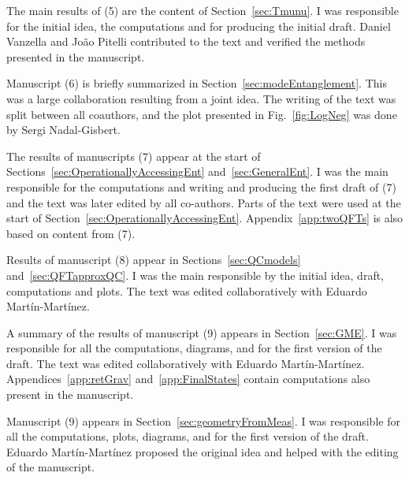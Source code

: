 The main results of (5) are the content of Section~\ref{sec:Tmunu}. I was responsible for the initial idea, the computations and for producing the initial draft. Daniel Vanzella and Jo\~ao Pitelli contributed to the text and verified the methods presented in the manuscript.

Manuscript (6) is briefly summarized in Section~\ref{sec:modeEntanglement}. This was a large collaboration resulting from a joint idea. The writing of the text was split between all coauthors, and the plot presented in Fig.~\ref{fig:LogNeg} was done by Sergi Nadal-Gisbert.

The results of manuscripts (7) appear at the start of Sections~\ref{sec:OperationallyAccessingEnt} and~\ref{sec:GeneralEnt}. I was the main responsible for the computations and writing and producing the first draft of (7) and the text was later edited by all co-authors. Parts of the text were used at the start of Section~\ref{sec:OperationallyAccessingEnt}. Appendix~\ref{app:twoQFTs} is also based on content from (7).

Results of manuscript (8) appear in Sections~\ref{sec:QCmodels} and~\ref{sec:QFTapproxQC}. I was the main responsible by the initial idea, draft, computations and plots. The text was edited collaboratively with Eduardo Mart\'in-Mart\'inez. 

A summary of the results of manuscript (9) appears in Section~\ref{sec:GME}. I was responsible for all the computations, diagrams, and for the first version of the draft. The text was edited collaboratively with Eduardo Mart\'in-Mart\'inez. Appendices~\ref{app:retGrav} and~\ref{app:FinalStates} contain computations also present in the manuscript. 

Manuscript (9) appears in Section~\ref{sec:geometryFromMeas}. I was responsible for all the computations, plots, diagrams, and for the first version of the draft. Eduardo Mart\'in-Mart\'inez proposed the original idea and helped with the editing of the manuscript.


